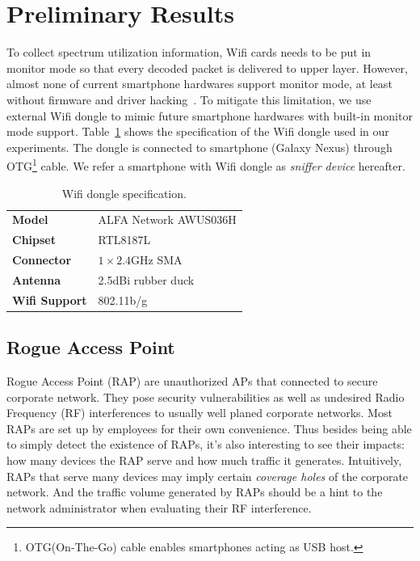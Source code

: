 \section{Preliminary Results}
\label{sec-results}


To collect spectrum utilization information, Wifi cards needs to be put in
monitor mode so that every decoded packet is delivered to upper layer.  However,
almost none of current smartphone hardwares support monitor mode, at
least without firmware and driver hacking~\cite{bcmon}. To mitigate this
limitation, we use external Wifi dongle to mimic future smartphone hardwares
with built-in monitor mode support. Table~\ref{tab:dongle} shows the
specification of the Wifi dongle used in our experiments. The dongle is
connected to smartphone (Galaxy Nexus) through OTG\footnote{OTG(On-The-Go) cable
enables smartphones acting as USB host.} cable. We refer a smartphone
with Wifi dongle as \textit{sniffer device} hereafter.

\begin{table}[t!]
  \centering
  \begin{tabular}{ll}
    \toprule
    \textbf{Model} & ALFA Network AWUS036H \\
    \textbf{Chipset} & RTL8187L \\
    \textbf{Connector} & $1\times2.4$GHz SMA \\
    \textbf{Antenna} & 2.5dBi rubber duck \\
    \textbf{Wifi Support} & 802.11b/g \\
    \bottomrule
  \end{tabular}
  \caption{Wifi dongle specification.}
  \label{tab:dongle}
\end{table}


\subsection{Rogue Access Point}

Rogue Access Point (RAP) are unauthorized APs that connected to secure corporate
network. They pose security vulnerabilities as well as undesired Radio Frequency
(RF) interferences to usually well planed corporate networks. Most RAPs are set
up by employees for their own convenience. Thus besides being able to simply
detect the existence of RAPs, it's also interesting to see their impacts: how
many devices the RAP serve and how much traffic it generates. Intuitively, RAPs 
that serve many devices may imply certain \textit{coverage holes} of the
corporate network. And the traffic volume generated by RAPs should be a hint to
the network administrator when evaluating their RF interference.

